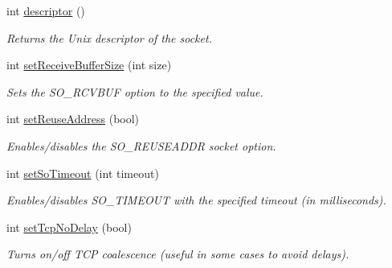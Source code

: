 \begin{DoxyCompactItemize}
\mbox{\label{classcppu_1_1_server_socket_a905d85f63fdca46ed5ee44eb00e211d1}} 
int \mbox{\hyperlink{classcppu_1_1_server_socket_a905d85f63fdca46ed5ee44eb00e211d1}{descriptor}} ()
\begin{DoxyCompactList}\small\item\em Returns the Unix descriptor of the socket. \end{DoxyCompactList}\item 
\mbox{\label{classcppu_1_1_server_socket_a0fbd0ee42bcfecf2e749279c4b94b0b3}} 
int \mbox{\hyperlink{classcppu_1_1_server_socket_a0fbd0ee42bcfecf2e749279c4b94b0b3}{set\+Receive\+Buffer\+Size}} (int size)
\begin{DoxyCompactList}\small\item\em Sets the S\+O\+\_\+\+R\+C\+V\+B\+UF option to the specified value. \end{DoxyCompactList}\item 
\mbox{\label{classcppu_1_1_server_socket_a09d0494cc0f65abe496b9c940d2920ed}} 
int \mbox{\hyperlink{classcppu_1_1_server_socket_a09d0494cc0f65abe496b9c940d2920ed}{set\+Reuse\+Address}} (bool)
\begin{DoxyCompactList}\small\item\em Enables/disables the S\+O\+\_\+\+R\+E\+U\+S\+E\+A\+D\+DR socket option. \end{DoxyCompactList}\item 
\mbox{\label{classcppu_1_1_server_socket_a0ceb984eab0cdd9c7c8e62658a521175}} 
int \mbox{\hyperlink{classcppu_1_1_server_socket_a0ceb984eab0cdd9c7c8e62658a521175}{set\+So\+Timeout}} (int timeout)
\begin{DoxyCompactList}\small\item\em Enables/disables S\+O\+\_\+\+T\+I\+M\+E\+O\+UT with the specified timeout (in milliseconds). \end{DoxyCompactList}\item 
\mbox{\label{classcppu_1_1_server_socket_ac5f6da333208cce9ca4d5392259a0a6b}} 
int \mbox{\hyperlink{classcppu_1_1_server_socket_ac5f6da333208cce9ca4d5392259a0a6b}{set\+Tcp\+No\+Delay}} (bool)
\begin{DoxyCompactList}\small\item\em Turns on/off T\+CP coalescence (useful in some cases to avoid delays). \end{DoxyCompactList}\end{DoxyCompactItemize}
